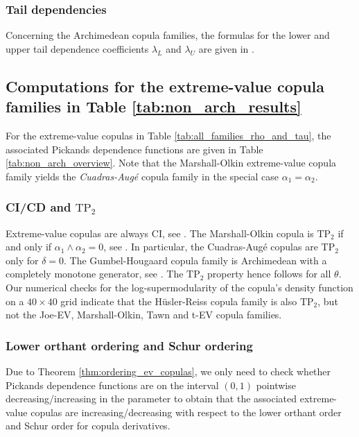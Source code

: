 \documentclass{article}
\newcommand{\TP}{\mathrm{TP_2}}
\begin{document}
\subsubsection{Tail dependencies}
\label{subsubsec:archimedean_tails}
Concerning the Archimedean copula families, the formulas for the lower and upper tail dependence coefficients $\lambda_L$ and $\lambda_U$ are given in \cite[Example 5.22]{Nelsen-2006}.

\subsection{Computations for the extreme-value copula families in Table \ref{tab:non_arch_results}}
\label{subsec:extreme_value}

For the extreme-value copulas in Table \ref{tab:all_families_rho_and_tau}, the associated Pickands dependence functions are given in Table \ref{tab:non_arch_overview}.
Note that the Marshall-Olkin extreme-value copula family yields the \textit{Cuadras-Augé} copula family in the special case $\alpha_1 = \alpha_2$.

\subsubsection{CI/CD and $\TP$}
\label{subsubsec:extreme_value_ci_and_TP2}

Extreme-value copulas are always CI, see \cite[Th\'{e}or\`{e}me 1]{Guillem-2000}.
The Marshall-Olkin copula is $\TP$ if and only if $\alpha_1 \wedge \alpha_2 = 0$, see \cite[Example 3.6]{fuchs2023total}.
In particular, the Cuadras-Augé copulas are $\TP$ only for $\delta=0$.
The Gumbel-Hougaard copula family is Archimedean with a completely monotone generator, see \cite[Table 2]{hofert2008sampling}.
The $\TP$ property hence follows for all $\theta$.
Our numerical checks for the log-supermodularity of the copula's density function on a $40\times40$ grid indicate that the Hüsler-Reiss copula family is also $\TP$, but not the Joe-EV, Marshall-Olkin, Tawn and t-EV copula families.


\subsubsection{Lower orthant ordering and Schur ordering}
\label{subsubsec:extreme_value_lo_ordering}

Due to Theorem \ref{thm:ordering_ev_copulas}, we only need to check whether Pickands dependence functions are on the interval \((0,1)\) pointwise decreasing/increasing in the parameter to obtain that the associated extreme-value copulas are increasing/decreasing with respect to the lower orthant order and Schur order for copula derivatives.
\end{document}

